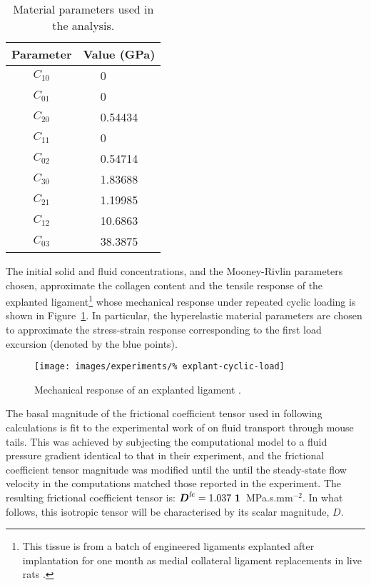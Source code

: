 \begin{table}[!hptb]
  \centering
  \begin{tabular}{|c|c|}
    \hline Parameter & Value (GPa) \\
    \hline \hline
    $C_{10}$  &   0$\phantom{.00000}$  \\
    $C_{01}$  &   0$\phantom{.00000}$  \\
    $C_{20}$  &   0.54434  \\
    $C_{11}$  &   0$\phantom{.00000}$  \\
    $C_{02}$  &   0.54714  \\
    $C_{30}$  &   1.83688  \\
    $C_{21}$  &   1.19985  \\
    $C_{12}$  &   10.6863  \\
    $C_{03}$  &   38.3875  \\
    \hline
  \end{tabular}
  \caption{Material parameters used in the analysis.}
  \label{parameters-explant}
\end{table}

The initial solid and fluid concentrations, and the Mooney-Rivlin
parameters chosen, approximate the collagen content and the tensile
response of the explanted ligament\footnote{This tissue is from a
  batch of engineered ligaments explanted after implantation for one
  month as medial collateral ligament replacements in live rats
  \citep{ma:07}.} whose mechanical response under repeated cyclic
loading is shown in Figure~\ref{explanted-ligament}. In particular,
the hyperelastic material parameters are chosen to approximate the
stress-strain response corresponding to the first load excursion
(denoted by the blue points).

\begin{figure}[!hptb]
  \centering
  \texttt{[image: images/experiments/\%
    explant-cyclic-load]}
  \caption{Mechanical response of an explanted ligament
    \citep{ma:07}.}
  \label{explanted-ligament}
\end{figure}

The basal magnitude of the frictional coefficient tensor used in
following calculations is fit to the experimental work of
\citet{Swartzetal:99} on fluid transport through mouse tails. This was
achieved by subjecting the computational model to a fluid pressure
gradient identical to that in their experiment, and the frictional
coefficient tensor magnitude was modified until the until the
steady-state flow velocity in the computations matched those reported
in the experiment. The resulting frictional coefficient tensor is:
$\bD^{\mathrm{fc}} = 1.037 \ \bone$~MPa.s.mm$^{-2}$. In what follows,
this isotropic tensor will be characterised by its scalar magnitude,
$D$.

